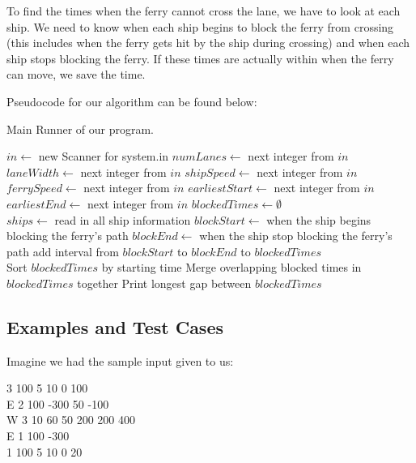 \documentclass[12pt]{article}
\begin{document}
To find the times when the ferry cannot cross the lane, we
have to look at each ship. We need to know when each ship
begins to block the ferry from crossing (this includes when
the ferry gets hit by the ship during crossing) and when
each ship stops blocking the ferry. If these times are
actually within when the ferry can move, we save the time.

Pseudocode for our algorithm can be found below:

\begin{algorithm}[H]
\caption{Main Runner of our program.}
\begin{algorithmic}
    \State $in \gets$ new Scanner for system.in
        \State $numLanes \gets$ next integer from $in$
        \State $laneWidth \gets$ next integer from $in$
        \State $shipSpeed \gets$ next integer from $in$
        \State $ferrySpeed \gets$ next integer from $in$
        \State $earliestStart \gets$ next integer from $in$
        \State $earliestEnd \gets$ next integer from $in$
        \State $blockedTimes \gets \emptyset$
        \\
            \State $ships \gets$ read in all ship information
                \State $blockStart \gets$ when the ship begins blocking the ferry's path
                \State $blockEnd \gets$ when the ship stop blocking the ferry's path
                    \State add interval from $blockStart$ to $blockEnd$ to $blockedTimes$
                \EndIf
            \EndFor
        \EndFor
        \\
        \State Sort $blockedTimes$ by starting time
        \State Merge overlapping blocked times in $blockedTimes$ together
        \State Print longest gap between $blockedTimes$
    \EndWhile
    \EndProcedure
\end{algorithmic}
\end{algorithm}

\subsection{Examples and Test Cases}

Imagine we had the sample input given to us:

\begin{center}
3 100 5 10 0 100 \\
E 2 100 -300 50 -100 \\
W 3 10 60 50 200 200 400 \\
E 1 100 -300 \\
1 100 5 10 0 20 \\
\end{center}
\end{document}
